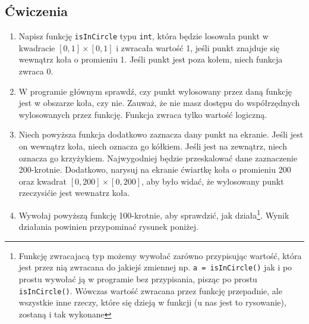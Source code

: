 \documentclass{instrukcja}
\begin{document}
\subsection*{Ćwiczenia}
\begin{enumerate}
\item Napisz funkcję {\tt isInCircle} typu {\tt int}, która będzie losowała punkt w kwadracie \([0,1]\times[0,1]\) i zwracała wartość 1, jeśli punkt znajduje się wewnątrz koła o promieniu 1. Jeśli punkt jest poza kołem, niech funkcja zwraca 0.
\item W programie głównym sprawdź, czy punkt wylosowany przez daną funkcję jest w obszarze koła, czy nie. Zauważ, że nie masz dostępu do współrzędnych wylosowanych przez funkcję. Funkcja zwraca tylko wartość logiczną.
\item Niech powyższa funkcja dodatkowo zaznacza dany punkt na ekranie. Jeśli jest on wewnątrz koła, niech oznacza go kółkiem. Jeśli jest na zewnątrz, niech oznacza go krzyżykiem. Najwygodniej będzie przeskalować dane zaznaczenie 200-krotnie. Dodatkowo, narysuj na ekranie ćwiartkę koła o promieniu 200 oraz kwadrat  \([0,200]\times[0,200]\), aby było widać, że wylosowany punkt rzeczysićie jest wewnatrz koła.
\item Wywołaj powyższą funkcję 100-krotnie, aby sprawdzić, jak działa\footnote{Funkcję zwracajacą typ możemy wywołać zarówno przypisując wartość, która jest przez nią zwracana do jakiejś zmiennej np. {\tt a = isInCircle()} jak i po prostu wywołać ją w programie bez przypisania, pisząc po prostu {\tt isInCircle()}. Wówczas wartość zwracana przez funkcję przepadnie, ale wszystkie inne rzeczy, które się dzieją w funkcji (u nas jest to rysowanie), zostaną i tak wykonane }. Wynik działania powinien przypominać rysunek poniżej.\newline
\end{enumerate}
\end{document}
